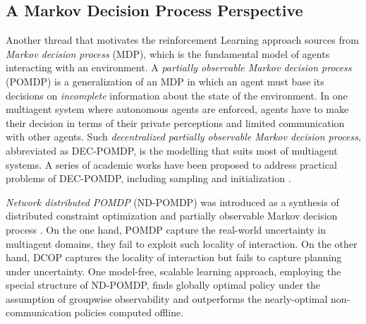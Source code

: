 \documentclass[conference]{IEEEtran}
\begin{document}
\subsection{A Markov Decision Process Perspective}
Another thread that motivates the reinforcement Learning approach sources from 
\textit{Markov decision process} (MDP), which is the fundamental model of
agents interacting with an environment.
A \textit{partially observable Markov decision process}
(POMDP) is a generalization of an MDP in which an agent must base its
decisions on \textit{incomplete} information about the state of the environment. 
In one multiagent system where autonomous agents are enforced, agents have to
make their decision in terms of their private perceptions and limited
communication with other agents. Such \textit{decentralized partially
    observable Markov decision process}, abbreviated as DEC-POMDP, is the
modelling that suits most of multiagent systems. A series of academic works
have been proposed to address practical problems of DEC-POMDP, including
sampling \cite{banerjee2012sample} and initialization
\cite{kraemer2012informed}. 

\textit{Network distributed POMDP} (ND-POMDP) was introduced as a synthesis of
 distributed constraint optimization and partially observable Markov decision
 process \cite{nair2005networked}. On the one hand, POMDP capture the
 real-world uncertainty in multiagent domains, they fail to exploit such
 locality of interaction. On the other hand, DCOP captures the locality of
 interaction but fails to capture planning under uncertainty.
One model-free, scalable learning approach, employing the special structure
of ND-POMDP, finds globally optimal policy under the assumption
of groupwise observability and outperforms the nearly-optimal
non-communication policies computed offline\cite{zhang2011coordinated}. 
\end{document}
